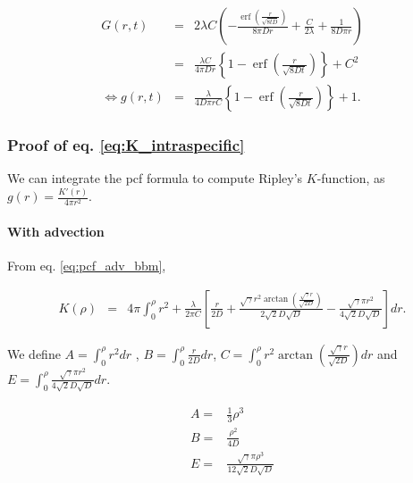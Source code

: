 \documentclass[english]{article}
\DeclareMathOperator\erf{erf}
\begin{document}
\begin{equation}
\begin{array}{ccc}
G(r,t) & = & 2\lambda C\left(-\frac{\erf\left(\frac{r}{\sqrt{8tD}}\right)}{8\pi Dr}+\frac{C}{2\lambda}+\frac{1}{8D\pi r}\right)\\
 & = & \frac{\lambda C}{4\pi Dr}\left\{ 1-\erf\left(\frac{r}{\sqrt{8Dt}}\right)\right\} +C^{2}\\
\Leftrightarrow g(r,t) & = & \frac{\lambda}{4D\pi rC}\left\{ 1-\erf\left(\frac{r}{\sqrt{8Dt}}\right)\right\} +1.
\end{array}\label{eq:pcf_noadv_bbm}
\end{equation}


\subsubsection*{Proof of eq. \ref{eq:K_intraspecific}}

We can integrate the pcf formula to compute Ripley's $K$-function,
as $g(r)=\frac{K'(r)}{4\pi r^{2}}$. 

\paragraph{With advection}

From eq. \ref{eq:pcf_adv_bbm}, 

\begin{equation}
\begin{array}{ccc}
K(\rho) & = & 4\pi\int_{0}^{\rho}r^{2}+\frac{\lambda}{2\pi C}\left[\frac{r}{2D}+\frac{\sqrt{\gamma}r^{2}\arctan\left(\frac{\sqrt{\gamma}r}{\sqrt{2D}}\right)}{2\sqrt{2}D\sqrt{D}}-\frac{\sqrt{\gamma}\pi r^{2}}{4\sqrt{2}D\sqrt{D}}\right]dr.\end{array}\label{eq:start-K}
\end{equation}

We define $A=\int_{0}^{\rho}r^{2}dr$ , $B=\int_{0}^{\rho}\frac{r}{2D}dr$,
$C=\int_{0}^{\rho}r^{2}\arctan\left(\frac{\sqrt{\gamma}r}{\sqrt{2D}}\right)dr$
and $E=\int_{0}^{\rho}\frac{\sqrt{\gamma}\pi r^{2}}{4\sqrt{2}D\sqrt{D}}dr$. 

\begin{equation}
\begin{array}{cc}
A= & \frac{1}{3}\rho^{3}\\
B= & \frac{\rho^{2}}{4D}\\
E= & \frac{\sqrt{\gamma}\pi\rho^{3}}{12\sqrt{2}D\sqrt{D}}
\end{array}
\end{equation}
\end{document}
